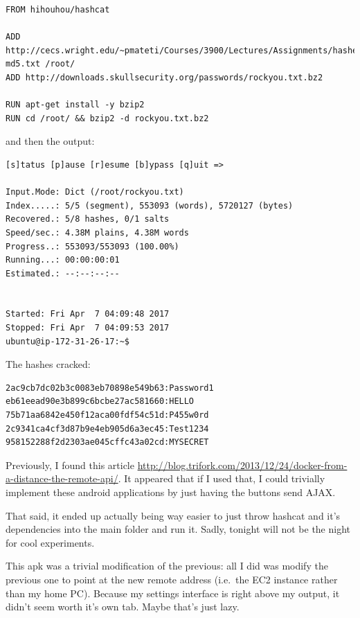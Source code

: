 \documentclass{article}
\begin{document}
\begin{verbatim}
FROM hihouhou/hashcat

ADD http://cecs.wright.edu/~pmateti/Courses/3900/Lectures/Assignments/hashes-md5.txt /root/
ADD http://downloads.skullsecurity.org/passwords/rockyou.txt.bz2

RUN apt-get install -y bzip2
RUN cd /root/ && bzip2 -d rockyou.txt.bz2
\end{verbatim}

and then the output:
\begin{verbatim}
[s]tatus [p]ause [r]esume [b]ypass [q]uit =>

Input.Mode: Dict (/root/rockyou.txt)
Index.....: 5/5 (segment), 553093 (words), 5720127 (bytes)
Recovered.: 5/8 hashes, 0/1 salts
Speed/sec.: 4.38M plains, 4.38M words
Progress..: 553093/553093 (100.00%)
Running...: 00:00:00:01
Estimated.: --:--:--:--


Started: Fri Apr  7 04:09:48 2017
Stopped: Fri Apr  7 04:09:53 2017
ubuntu@ip-172-31-26-17:~$
\end{verbatim}

The hashes cracked:
\begin{verbatim}
2ac9cb7dc02b3c0083eb70898e549b63:Password1
eb61eead90e3b899c6bcbe27ac581660:HELLO
75b71aa6842e450f12aca00fdf54c51d:P455w0rd
2c9341ca4cf3d87b9e4eb905d6a3ec45:Test1234
958152288f2d2303ae045cffc43a02cd:MYSECRET
\end{verbatim}

Previously, I found this article \url{http://blog.trifork.com/2013/12/24/docker-from-a-distance-the-remote-api/}. It appeared that if I used that, I could trivially implement these android applications by just having the buttons send AJAX.

That said, it ended up actually being way easier to just throw hashcat and it's dependencies into the main folder and run it. Sadly, tonight will not be the night for cool experiments.

This apk was a trivial modification of the previous: all I did was modify the previous one to point at the new remote address (i.e.\ the EC2 instance rather than my home PC). Because my settings interface is right above my output, it didn't seem worth it's own tab. Maybe that's just lazy.
\end{document}
